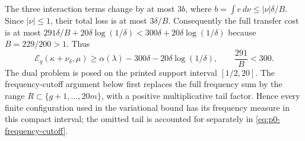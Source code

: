 The three interaction terms change by at most $3b$, where
$b=\int e\,d\nu\le|\nu|\delta/B$.  Since $|\nu|\le1$, their total loss is
 at most $3\delta/B$.  Consequently the full transfer cost is at most
$291\delta/B+20\delta\log(1/\delta)
 <300\delta+20\delta\log(1/\delta)$ because $B=229/200>1$.
Thus
\[
 \mathcal E_q(\kappa+\nu_\delta,\mu)
       \ge\alpha(\lambda)-300\delta-20\delta\log(1/\delta),
       \qquad \frac{291}{B}<300.
\]
The dual problem is posed on the printed support interval \([1/2,20]\).
The frequency-cutoff argument below first replaces the full frequency sum by
the range \(R\subset\{g+1,\ldots,20m\}\), with a positive multiplicative
tail factor.  Hence every finite configuration used in the variational bound
has its frequency measure in this compact interval; the omitted tail is
accounted for separately in \eqref{eq:p0-frequency-cutoff}.

